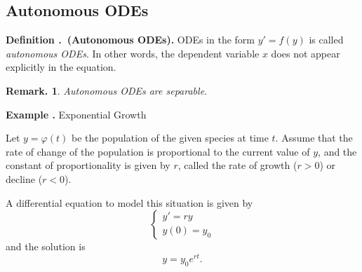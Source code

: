 \documentclass[12pt, a4paper]{article}
\newcounter{index}[subsection]
\newenvironment*{df}[1]{\par\noindent\textbf{Definition \thesubsection.\stepcounter{index}\theindex\ (#1).}}{\par}
\newenvironment*{eg}{\begin{framed}\par\noindent\textbf{Example \thesubsection.\stepcounter{index}\theindex}}{\par\end{framed}}
\newtheorem*{rmk}{Remark.}
\def\phi{\varphi}
\begin{document}
\subsection{Autonomous ODEs}
\begin{df}{Autonomous ODEs}
	ODEs in the form $y'=f(y)$ is called \textit{autonomous ODEs}. In other words, the dependent variable $x$ does not appear explicitly in the equation.
\end{df}
\begin{rmk} Autonomous ODEs are separable.\end{rmk}
\begin{eg}
	Exponential Growth\par 
	Let $y=\phi(t)$ be the population of the given species at time $t$. Assume that the rate of change of the population is proportional to the current value of $y$, and the constant of proportionality is given by $r$, called the rate of growth ($r>0$) or decline ($r<0$). \par 
	A differential equation to model this situation is given by \[\begin{cases}y'=ry\\y(0)=y_0\end{cases}\] and the solution is \[y=y_0e^{rt}.\]
\end{eg}
\end{document}
